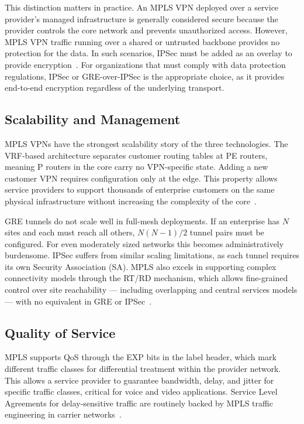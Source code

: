 \documentclass[conference]{IEEEtran}
\begin{document}
This distinction matters in practice. An MPLS VPN deployed over a
service provider's managed infrastructure is generally considered
secure because the provider controls the core network and prevents
unauthorized access. However, MPLS VPN traffic running over a
shared or untrusted backbone provides no protection for the data.
In such scenarios, IPSec must be added as an overlay to provide
encryption~\cite{fayed2024}. For organizations that must comply with
data protection regulations, IPSec or GRE-over-IPSec is the
appropriate choice, as it provides end-to-end encryption
regardless of the underlying transport.

\subsection{Scalability and Management}

MPLS VPNs have the strongest scalability story of the three
technologies. The VRF-based architecture separates customer routing
tables at PE routers, meaning P routers in the core carry no
VPN-specific state. Adding a new customer VPN requires configuration
only at the edge. This property allows service providers to support
thousands of enterprise customers on the same physical
infrastructure without increasing the complexity of the
core~\cite{mungse2023}.

GRE tunnels do not scale well in full-mesh deployments. If an
enterprise has $N$ sites and each must reach all others, $N(N-1)/2$
tunnel pairs must be configured. For even moderately sized networks
this becomes administratively burdensome. IPSec suffers from
similar scaling limitations, as each tunnel requires its own
Security Association (SA). MPLS also excels in supporting complex
connectivity models through the RT/RD mechanism, which allows
fine-grained control over site reachability --- including overlapping
and central services models --- with no equivalent in GRE or
IPSec~\cite{fayed2024}.

\subsection{Quality of Service}

MPLS supports QoS through the EXP bits in the label header, which
mark different traffic classes for differential treatment within
the provider network. This allows a service provider to guarantee
bandwidth, delay, and jitter for specific traffic classes, critical
for voice and video applications. Service Level Agreements for
delay-sensitive traffic are routinely backed by MPLS traffic
engineering in carrier networks~\cite{fayed2024}.
\end{document}

